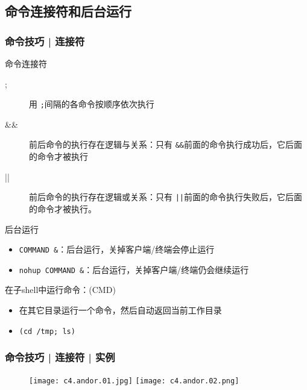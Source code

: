 \subsection{命令连接符和后台运行}
\begin{frame}[fragile]
  \frametitle{命令技巧 | \alert{连接符}}
  \begin{block}{命令连接符}
    \begin{description}
      \item[;] 用 \verb|;|间隔的各命令按顺序依次执行
      \item[\&\&] 前后命令的执行存在逻辑与关系：只有 \verb|&&|前面的命令执行成功后，它后面的命令才被执行
      \item[||] 前后命令的执行存在逻辑或关系：只有 \verb=||=前面的命令执行失败后，它后面的命令才被执行。
    \end{description}
  \end{block}
  \pause
  \vspace{-0.5em}
  \begin{block}{后台运行}
    \begin{itemize}
      \item \verb|COMMAND &|：后台运行，关掉客户端/终端会停止运行
      \item \verb|nohup COMMAND &|：后台运行，关掉客户端/终端仍会继续运行
    \end{itemize}
  \end{block}
  \pause
  \vspace{-0.5em}
  \begin{block}{在子shell中运行命令：(CMD)}
    \begin{itemize}
      \item 在其它目录运行一个命令，然后自动返回当前工作目录
      \item \verb|(cd /tmp; ls)|
    \end{itemize}
  \end{block}
\end{frame}

\begin{frame}
  \frametitle{命令技巧 | 连接符 | 实例}
  \begin{figure}
  \centering
    \texttt{[image: c4.andor.01.jpg]}
    \vspace{0.3cm}
    \texttt{[image: c4.andor.02.png]}
  \end{figure}
\end{frame}


